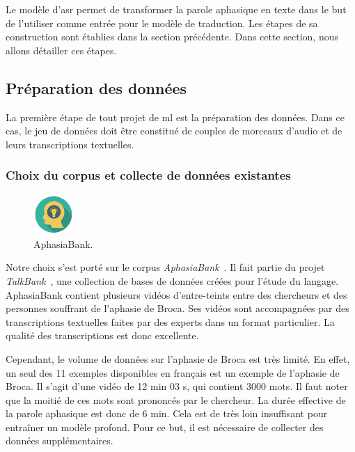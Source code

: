 \section{}

Le modèle d'\gls{asr} permet de transformer la parole aphasique en texte
dans le but de l'utiliser comme entrée pour le modèle de traduction.
Les étapes de sa construction sont établies dans la section précédente.
Dans cette section, nous allons détailler ces étapes.

\subsection{Préparation des données}

La première étape de tout projet de \gls{ml} est la préparation des données.
Dans ce cas, le jeu de données doit être constitué de couples de morceaux d'audio et de leurs transcriptions textuelles.

\subsubsection{Choix du corpus et collecte de données existantes}

\begin{figure}
    \includegraphics[width=1.5cm]{assets/images/bank.jpeg}
    \caption*{\footnotesize AphasiaBank.}
\end{figure}

Notre choix s'est porté sur le corpus \textit{AphasiaBank}~\cite{MacWhinney_Fromm_Forbes_Holland_2011}.
Il fait partie du projet \textit{TalkBank}~\cite{macwhinney2007talkbank},
une collection de bases de données créées pour l'étude du langage.
AphasiaBank contient plusieurs vidéos d'entre-teints entre des chercheurs 
et des personnes souffrant de l'aphasie de Broca.
Ses vidéos sont accompagnées par des transcriptions textuelles faites par des experts dans un format particulier.
La qualité des transcriptions est donc excellente.

Cependant, le volume de données sur l'aphasie de Broca est très limité.
En effet, un seul des 11 exemples disponibles en français est un exemple de l'aphasie de Broca.
Il s'agit d'une vidéo de 12 min 03 s, qui contient 3000 mots.
Il faut noter que la moitié de ces mots sont prononcés par le chercheur.
La durée effective de la parole aphasique est donc de 6 min.
Cela est de très loin insuffisant pour entraîner un modèle profond.
Pour ce but, il est nécessaire de collecter des données supplémentaires. 

